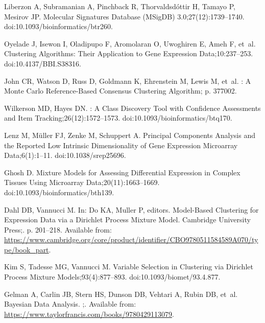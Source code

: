 \documentclass[10pt,letterpaper]{article}
\begin{document}
\begin{thebibliography}{10}
	Liberzon A, Subramanian A, Pinchback R, Thorvaldsdóttir H, Tamayo P, Mesirov
	JP.
	\newblock Molecular Signatures Database ({{MSigDB}}) 3.0;27(12):1739--1740.
	\newblock doi:{10.1093/bioinformatics/btr260}.
	
	Oyelade J, Isewon I, Oladipupo F, Aromolaran O, Uwoghiren E, Ameh F, et~al.
	\newblock Clustering {{Algorithms}}: {{Their Application}} to {{Gene Expression
			Data}};10:237--253.
	\newblock doi:{10.4137/BBI.S38316}.
	
	John CR, Watson D, Russ D, Goldmann K, Ehrenstein M, Lewis M, et~al.
	: {{A Monte Carlo}} Reference-Based Consensus Clustering
	Algorithm; p. 377002.
	
	Wilkerson MD, Hayes DN.
	: A Class Discovery Tool with Confidence
	Assessments and Item Tracking;26(12):1572--1573.
	\newblock doi:{10.1093/bioinformatics/btq170}.
	
	Lenz M, Müller FJ, Zenke M, Schuppert A.
	\newblock Principal Components Analysis and the Reported Low Intrinsic
	Dimensionality of Gene Expression Microarray Data;6(1):1--11.
	\newblock doi:{10.1038/srep25696}.
	
	Ghosh D.
	\newblock Mixture Models for Assessing Differential Expression in Complex
	Tissues Using Microarray Data;20(11):1663--1669.
	\newblock doi:{10.1093/bioinformatics/bth139}.
	
	Dahl DB, Vannucci M.
	\newblock In: Do KA, Muller P, editors. Model-{{Based Clustering}} for
	{{Expression Data}} via a {{Dirichlet Process Mixture Model}}. {Cambridge
		University Press};. p. 201--218.
	\newblock Available from:
	\url{https://www.cambridge.org/core/product/identifier/CBO9780511584589A070/type/book_part}.
	
	Kim S, Tadesse MG, Vannucci M.
	\newblock Variable Selection in Clustering via {{Dirichlet}} Process Mixture
	Models;93(4):877--893.
	\newblock doi:{10.1093/biomet/93.4.877}.
	
	Gelman A, Carlin JB, Stern HS, Dunson DB, Vehtari A, Rubin DB, et~al.
	\newblock Bayesian {{Data Analysis}}.
	;.
	\newblock Available from:
	\url{https://www.taylorfrancis.com/books/9780429113079}.
	

\end{thebibliography}
\end{document}
